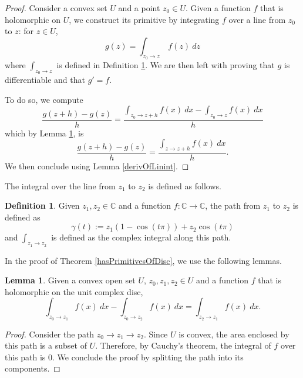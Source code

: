 \documentclass{report}
\theoremstyle{definition}
\newtheorem{definition}{Definition}
\newtheorem{lemma}{Lemma}
\begin{document}
\begin{proof}
  Consider a convex set $U$ and a point $z_0\in U$.
  Given a function $f$ that is holomorphic on $U$, we construct its primitive by integrating $f$ over a line from $z_0$ to $z$: for $z\in U$,
  \begin{equation}
    g(z)=\int_{z_0\to z}\ f(z)\ dz
  \end{equation}
  where $\int_{z_0\to z}$ is defined in Definition \ref{linint}.
  We are then left with proving that $g$ is differentiable and that $g'=f$.

  To do so, we compute
  \begin{equation}
    \frac{g(z+h)-g(z)}h
    =
    \frac{\int_{z_0\to z+h} f(x)\ dx-\int_{z_0\to z} f(x)\ dx}h
  \end{equation}
  which by Lemma \ref{diffOfIntegrals}, is
  \begin{equation}
    \frac{g(z+h)-g(z)}h
    =
    \frac{\int_{z\to z+h} f(x)\ dx}h
    .
  \end{equation}
  We then conclude using Lemma \ref{derivOfLinint}.
\end{proof}

The integral over the line from $z_1$ to $z_2$ is defined as follows.

\begin{definition}
  \label{linint}
  \leanok
  Given $z_1,z_2\in\mathbb C$ and a function $f:\mathbb C\to\mathbb C$, the path from $z_1$ to $z_2$ is defined as
  \begin{equation}
    \gamma(t):=z_1(1-\cos(t\pi))+z_2\cos(t\pi)
  \end{equation}
  and $\int_{z_1\to z_2}$ is defined as the complex integral along this path.
\end{definition}

In the proof of Theorem \ref{hasPrimitivesOfDisc}, we use the following lemmas.

\begin{lemma}
  \label{diffOfIntegrals}
  \leanok
  Given a convex open set $U$, $z_0,z_1,z_2\in U$ and a function $f$ that is holomorphic on the unit complex disc,
  \begin{equation}
    \int_{z_0\to z_1} f(x)\ dx
    -
    \int_{z_0\to z_2} f(x)\ dx
    =
    \int_{z_2\to z_1} f(x)\ dx
    .
  \end{equation}
\end{lemma}

\begin{proof}
  Consider the path $z_0\to z_1\to z_2$.
  Since $U$ is convex, the area enclosed by this path is a subset of $U$.
  Therefore, by Cauchy's theorem, the integral of $f$ over this path is 0.
  We conclude the proof by splitting the path into its components.
\end{proof}
\end{document}
